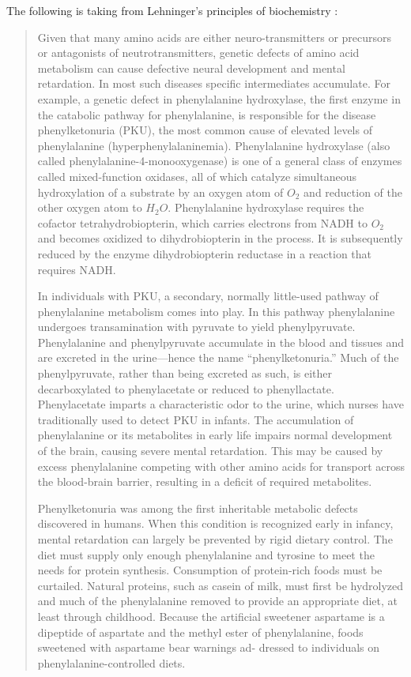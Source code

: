 \documentclass{article}
\begin{document}
The following is taking from Lehninger's principles of biochemistry \cite{Lehninger_principlesBiochemistry}: 
\begin{quote}
Given that many amino acids are either neuro-transmitters or precursors or antagonists of neutrotransmitters, genetic defects of amino acid metabolism can cause defective neural development and mental retardation. In most such diseases specific intermediates accumulate. For example, a genetic defect in phenylalanine hydroxylase, the first enzyme in the catabolic pathway for phenylalanine, is responsible for the disease phenylketonuria (PKU), the most common cause of elevated levels of phenylalanine (hyperphenylalaninemia). Phenylalanine hydroxylase (also called phenylalanine-4-monooxygenase) is one of a general class of enzymes called mixed-function oxidases, all of which catalyze simultaneous hydroxylation of a substrate by an oxygen atom of $O_2$ and reduction of the other oxygen atom to $H_2O$. Phenylalanine hydroxylase requires the cofactor tetrahydrobiopterin, which carries electrons from NADH to $O_2$ and becomes oxidized to dihydrobiopterin in the process. It is subsequently reduced by the enzyme dihydrobiopterin reductase in a reaction that requires NADH.

In individuals with PKU, a secondary, normally little-used pathway of phenylalanine metabolism comes into play. In this pathway phenylalanine undergoes transamination with pyruvate to yield phenylpyruvate. Phenylalanine and phenylpyruvate accumulate in the blood and tissues and are excreted in the urine—hence the name “phenylketonuria.” Much of the phenylpyruvate, rather than being excreted as such, is either decarboxylated to phenylacetate or reduced to phenyllactate. Phenylacetate imparts a characteristic odor to the urine, which nurses have traditionally used to detect PKU in infants. The accumulation of phenylalanine or its metabolites in early life impairs normal development of the brain, causing severe mental retardation. This may be caused by excess phenylalanine competing with other amino acids for transport across the blood-brain barrier, resulting in a deficit of required metabolites.

Phenylketonuria was among the first inheritable metabolic defects discovered in humans. When this condition is recognized early in infancy, mental retardation can largely be prevented by rigid dietary control. The diet must supply only enough phenylalanine and tyrosine to meet the needs for protein synthesis. Consumption of protein-rich foods must be curtailed. Natural proteins, such as casein of milk, must first be hydrolyzed and much of the phenylalanine removed to provide an appropriate diet, at least through childhood. Because the artificial sweetener aspartame is a dipeptide of aspartate and the methyl ester of phenylalanine, foods sweetened with aspartame bear warnings ad- dressed to individuals on phenylalanine-controlled diets.
\end{quote}
\end{document}
